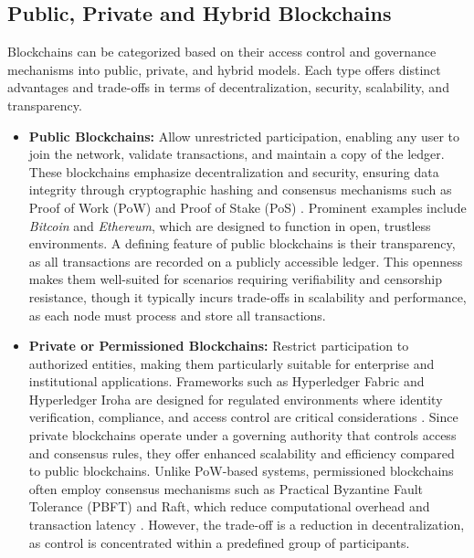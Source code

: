 \documentclass[final]{rc-book-2.14}
\begin{document}
\subsection{Public, Private and Hybrid Blockchains}

Blockchains can be categorized based on their access control and governance mechanisms into public, private, and hybrid models. Each type offers distinct advantages and trade-offs in terms of decentralization, security, scalability, and transparency.

\begin{itemize}

    \item \textbf{Public Blockchains:} Allow unrestricted participation, enabling any user to join the network, validate transactions, and maintain a copy of the ledger. These blockchains emphasize decentralization and security, ensuring data integrity through cryptographic hashing and consensus mechanisms such as Proof of Work (PoW) and Proof of Stake (PoS) \cite{nakamoto2008bitcoin}. Prominent examples include \textit{Bitcoin} and \textit{Ethereum}, which are designed to function in open, trustless environments. A defining feature of public blockchains is their transparency, as all transactions are recorded on a publicly accessible ledger. This openness makes them well-suited for scenarios requiring verifiability and censorship resistance, though it typically incurs trade-offs in scalability and performance, as each node must process and store all transactions.

    \item \textbf{Private or Permissioned Blockchains:} Restrict participation to authorized entities, making them particularly suitable for enterprise and institutional applications. Frameworks such as Hyperledger Fabric and Hyperledger Iroha are designed for regulated environments where identity verification, compliance, and access control are critical considerations \cite{cachin2016architecture}. Since private blockchains operate under a governing authority that controls access and consensus rules, they offer enhanced scalability and efficiency compared to public blockchains. Unlike PoW-based systems, permissioned blockchains often employ consensus mechanisms such as Practical Byzantine Fault Tolerance (PBFT) and Raft, which reduce computational overhead and transaction latency \cite{vukolic2017}. However, the trade-off is a reduction in decentralization, as control is concentrated within a predefined group of participants.


\end{itemize}
\end{document}
